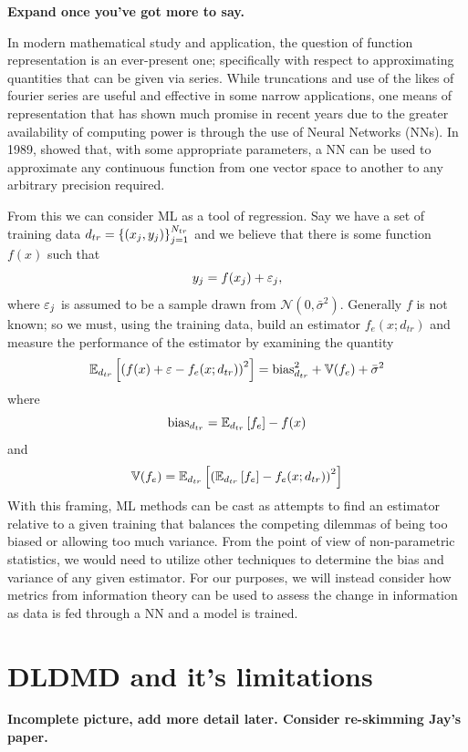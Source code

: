 \textbf{Expand once you've got more to say.}

In modern mathematical study and application, the question of function representation is
an ever-present one; specifically with respect to approximating quantities that can be 
given via series. While truncations and use of the likes of fourier series are useful and 
effective in some narrow applications, one means of representation that has shown much 
promise in recent years due to the greater availability of computing power is through 
the use of Neural Networks (NNs). In 1989, \cite{hornik} showed that, with some appropriate
parameters, a NN can be used to approximate any continuous function from one vector space 
to another to any arbitrary precision required. 

From this we can consider ML as a tool of regression. Say we have a set of training data
$d_{tr} = \left\{(x_j, y_j)\right\}_{j=1}^{N_{tr}}$ and we believe that there is some function
$f(x)$ such that 
$$y_j = f(x_j) + \varepsilon_j,$$
where $\varepsilon_j$ is assumed to be a sample drawn from $\mathcal{N}(0, \bar{\sigma}^2)$. 
Generally $f$ is not known; so we must, using the training data, build an estimator 
$f_e(x; d_{tr})$ and measure the performance of the estimator by examining the quantity
$$\mathbb{E}_{d_{tr}}\left[\left(f(x) + \varepsilon - f_e(x;d_{tr})\right)^2\right] = 
\text{bias}_{d_{tr}}^2 + \mathbb{V}(f_e) + \bar{\sigma}^2$$
where 
$$\text{bias}_{d_{tr}} = \mathbb{E}_{d_{tr}}\left[f_e\right] - f(x)$$
and 
$$\mathbb{V}(f_e) = \mathbb{E}_{d_{tr}}\left[\left(\mathbb{E}_{d_{tr}}\left[f_e\right] - f_e(x; d_{tr})\right)^2\right]$$ 
With this framing, ML methods can be cast as attempts to find an estimator relative to
a given training that balances the competing dilemmas of being too biased or allowing too
much variance. From the point of view of non-parametric statistics, we would need to utilize 
other techniques\cite{hollander} to determine the bias and variance of any given estimator. For our purposes, 
we will instead consider how metrics from information theory can be used to assess the change in 
information as data is fed through a NN and a model is trained.

\section{DLDMD and it's limitations}

\textbf{Incomplete picture, add more detail later. Consider re-skimming Jay's paper.}

